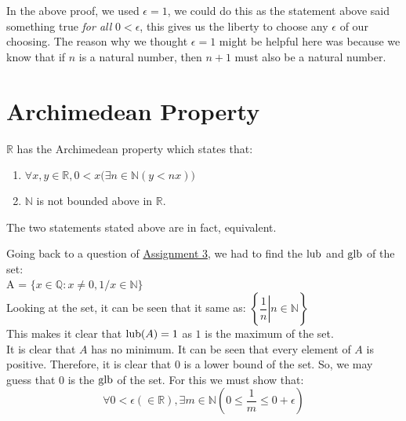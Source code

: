 In the above proof, we used $\epsilon = 1$, we could do this as the statement above said something true \textit{for all} $0 < \epsilon$, this gives us the liberty to choose any $\epsilon$ of our choosing. The reason why we thought $\epsilon=1$ might be helpful here was because we know that if $n$ is a natural number, then $n+1$ must also be a natural number.
%
\section{Archimedean Property}\label{sec:APoR}
$\mathbb{R}$ has the Archimedean property which states that:
\begin{enumerate}[nosep]
    \item $\forall x, y \in\mathbb{R}, 0 < x \big(\exists n \in \mathbb{N}(y < nx)\big)$
    \item $\mathbb{N}$ is not bounded above in $\mathbb{R}$.
\end{enumerate}

The two statements stated above are in fact, equivalent. 

\hrulefill

 
\hrulefill

Going back to a question of \hyperref[assign:3]{Assignment 3}, we had to find the $\operatorname{lub}$ and $\operatorname{glb}$ of the set:\\A = $\{x\in\mathbb{Q} : x\neq0, 1/x \in \mathbb{N}\}$\\
Looking at the set, it can be seen that it same as: $\left\{\left.\dfrac{1}{n}\right|n\in\mathbb{N}\right\}$\\
This makes it clear that $\operatorname{lub}(A)=1$ as $1$ is the maximum of the set.\\
It is clear that $A$ has no minimum. It can be seen that every element of $A$ is positive. Therefore, it is  clear that $0$ is a lower bound of the set. So, we may guess that $0$ is the $\operatorname{glb}$ of the set. For this we must show that:\\
$$\forall 0 < \epsilon (\in \mathbb{R}), \exists m\in \mathbb{N}\left(0 \le \dfrac{1}{m} \le 0 + \epsilon\right)$$

